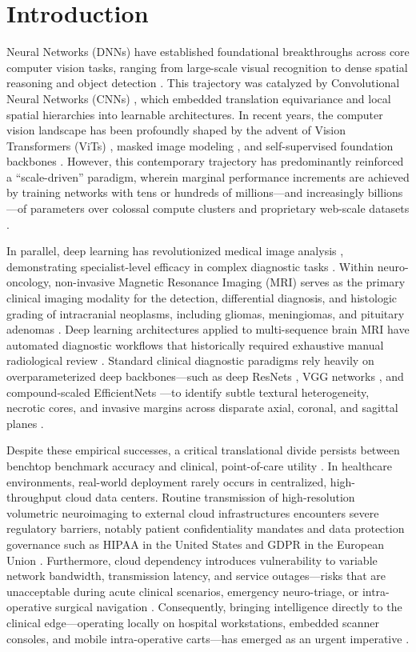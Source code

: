 \section{Introduction}
 Neural Networks (DNNs) have established foundational breakthroughs across core computer vision tasks, ranging from large-scale visual recognition \cite{11, 24} to dense spatial reasoning and object detection \cite{14, 53}. This trajectory was catalyzed by Convolutional Neural Networks (CNNs) \cite{23}, which embedded translation equivariance and local spatial hierarchies into learnable architectures. In recent years, the computer vision landscape has been profoundly shaped by the advent of Vision Transformers (ViTs) \cite{9}, masked image modeling \cite{46}, and self-supervised foundation backbones \cite{1}. However, this contemporary trajectory has predominantly reinforced a ``scale-driven'' paradigm, wherein marginal performance increments are achieved by training networks with tens or hundreds of millions---and increasingly billions---of parameters over colossal compute clusters and proprietary web-scale datasets \cite{11, 42}.

In parallel, deep learning has revolutionized medical image analysis \cite{10, 27}, demonstrating specialist-level efficacy in complex diagnostic tasks \cite{10}. Within neuro-oncology, non-invasive Magnetic Resonance Imaging (MRI) serves as the primary clinical imaging modality for the detection, differential diagnosis, and histologic grading of intracranial neoplasms, including gliomas, meningiomas, and pituitary adenomas \cite{2, 34}. Deep learning architectures applied to multi-sequence brain MRI have automated diagnostic workflows that historically required exhaustive manual radiological review \cite{2, 34, 38}. Standard clinical diagnostic paradigms rely heavily on overparameterized deep backbones---such as deep ResNets \cite{14}, VGG networks \cite{39}, and compound-scaled EfficientNets \cite{40}---to identify subtle textural heterogeneity, necrotic cores, and invasive margins across disparate axial, coronal, and sagittal planes \cite{36, 44}.

Despite these empirical successes, a critical translational divide persists between benchtop benchmark accuracy and clinical, point-of-care utility \cite{20, 26}. In healthcare environments, real-world deployment rarely occurs in centralized, high-throughput cloud data centers. Routine transmission of high-resolution volumetric neuroimaging to external cloud infrastructures encounters severe regulatory barriers, notably patient confidentiality mandates and data protection governance such as HIPAA in the United States and GDPR in the European Union \cite{10, 26}. Furthermore, cloud dependency introduces vulnerability to variable network bandwidth, transmission latency, and service outages---risks that are unacceptable during acute clinical scenarios, emergency neuro-triage, or intra-operative surgical navigation \cite{20, 33}. Consequently, bringing intelligence directly to the clinical edge---operating locally on hospital workstations, embedded scanner consoles, and mobile intra-operative carts---has emerged as an urgent imperative \cite{12, 25, 26}.

